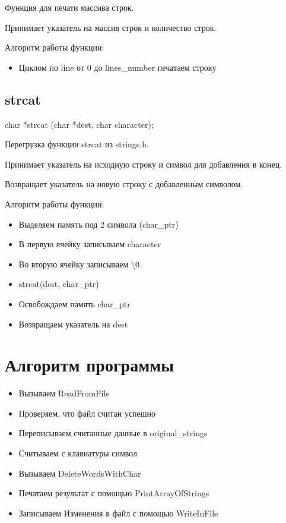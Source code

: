 \documentclass[12pt,a4paper]{article}  %
\begin{document}
	Функция для печати массива строк.
	
	Принимает указатель на массив строк и количество строк.
	
	
	Алгоритм работы функции:
	
	\begin{itemize}
		\item Циклом по line от 0 до lines\_number печатаем строку
	\end{itemize}
	
	\fi
	
	\subsection*{strcat}
	char *strcat (char *dest, char character);
	
	Перегрузка функции strcat из strings.h. 
	
	Принимает указатель на исходную строку и символ для добавления в конец.
	
	Возвращает указатель на новую строку с добавленным символом.
	
	
	Алгоритм работы функции:
	
	\begin{itemize}
		\item Выделяем память под 2 символа (char\_ptr)
		\item В первую ячейку записываем character
		\item Во вторую ячейку записываем \textbackslash 0
		\item strcat(dest, char\_ptr)
		\item Освобождаем память char\_ptr
		\item Возвращаем указатель на dest
	\end{itemize}
	
	\fi
	
	\section*{Алгоритм программы}
	
	\begin{itemize}
		\item Вызываем ReadFromFile
		\item Проверяем, что файл считан успешно
		\item Переписываем считанные данные в original\_strings
		\item Считываем с клавиатуры символ
		\item Вызываем DeleteWordsWithChar
		\item Печатаем результат с помощью PrintArrayOfStrings
		\item Записываем Изменения в файл с помощью WriteInFile
	\end{itemize}
	
\end{document}
